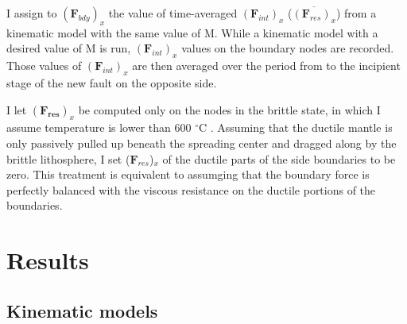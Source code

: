 \documentclass[letterpaper,12pt,notitle]{memphisthesis}                     %
\begin{document}
I assign to $(\boldsymbol{F}_{bdy})_x$ the value of time-averaged $(\boldsymbol{F}_{int})_x$ ($\overline{(\boldsymbol{F}_{res})_x}$) from a kinematic model with the same value of M. While a kinematic model with a desired value of M is run, $(\boldsymbol{F}_{int})_x$ values on the boundary nodes  are recorded. Those values of $(\boldsymbol{F}_{int})_{x}$ are then averaged over the period from  to the incipient stage of the new fault on the opposite side.

I let $(\boldsymbol{F_{res}})_x$ be computed only on the nodes in the brittle state, in which I assume temperature is lower than 600 $^\circ$C \citep[e.g.,][]{Violay2012}. Assuming that the ductile mantle is only passively pulled up beneath the spreading center and dragged along by the brittle lithosphere, I set ($\boldsymbol{F}_{res}$)$_x$ of the ductile parts of the side boundaries to be zero. This treatment is equivalent to assumging that the boundary force is perfectly balanced with the viscous resistance on the ductile portions of the boundaries. %

\chapter{Results}

\section{Kinematic models}
\end{document}
